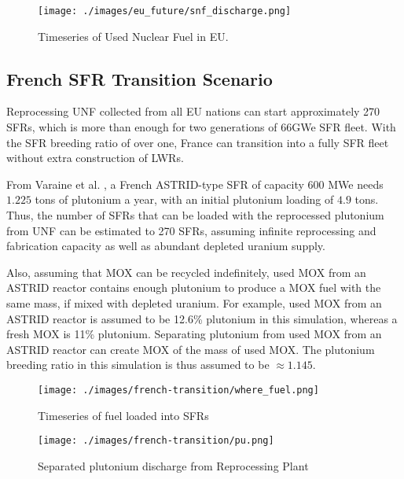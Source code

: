 \begin{figure}[htbp!]
	\begin{center}
		\texttt{[image: ./images/eu\_future/snf\_discharge.png]}
	\end{center}
	\caption{Timeseries of Used Nuclear Fuel in \gls{EU}.}
	\label{fig:eu_snf}
\end{figure}
\FloatBarrier

\subsection{French \gls{SFR} Transition Scenario}

Reprocessing \gls{UNF} collected from all EU nations can start approximately
270 \glspl{SFR}, which is more than enough for two generations of 66GWe \gls{SFR}
fleet. With the \gls{SFR} breeding ratio of over one, France can transition into
a fully \gls{SFR} fleet without extra construction of \glspl{LWR}. 

			
From Varaine et al. \cite{varaine_pre-conceptual_2012}, a French
ASTRID-type \gls{SFR} of capacity 600 MWe needs $1.225$ tons of
plutonium a year, with an initial plutonium loading of $4.9$ tons. 
Thus, the number of \glspl{SFR} that can be loaded with the reprocessed
plutonium from \gls{UNF} can be estimated to 270 \glspl{SFR},
assuming infinite reprocessing and fabrication capacity as well as
abundant depleted uranium supply. 

Also, assuming that \gls{MOX} can be recycled indefinitely,
used \gls{MOX} from an ASTRID reactor contains enough plutonium to produce a \gls{MOX} fuel with
the same mass, if mixed with depleted uranium. For example,
used \gls{MOX} from an ASTRID reactor is assumed to be 12.6\% plutonium
in this simulation, whereas a fresh \gls{MOX} is 11\% plutonium.
Separating plutonium from used \gls{MOX} from
an ASTRID reactor can create \gls{MOX} of the mass of used \gls{MOX}.
The plutonium breeding ratio in this simulation is thus assumed to be
$\approx 1.145$.


\begin{figure}[htbp!]
	\begin{center}
		\texttt{[image: ./images/french-transition/where\_fuel.png]}
	\end{center}
	\caption{Timeseries of fuel loaded into \glspl{SFR}}
	\label{fig:fuel}
\end{figure}

\begin{figure}[htbp!]
	\begin{center}
		\texttt{[image: ./images/french-transition/pu.png]}
	\end{center}
	\caption{Separated plutonium discharge from Reprocessing Plant}
	\label{fig:pu_no_cum}
\end{figure}



